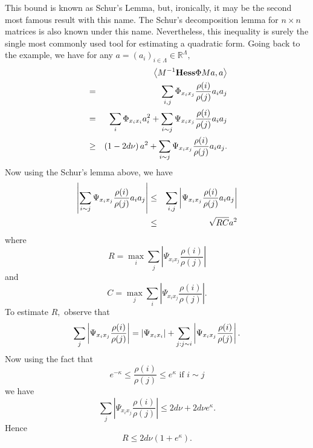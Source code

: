 \documentclass{article}
\begin{document}
This bound is known as Schur's Lemma, but, ironically, it may be the second
most famous result with this name. The Schur's decomposition lemma for $%
n\times n$ matrices is also known under this name. Nevertheless, this
inequality is surely the single most commonly used tool for estimating a
quadratic form. Going back to the example, we have for any $a=\left(
a_{i}\right) _{i\in \Lambda }\in \mathbb{R}^{\Lambda },$ 
\begin{eqnarray*}
&&\left\langle M^{-1}\mathbf{Hess}\Phi Ma,a\right\rangle  \\
&=&\sum_{i,j}\Phi _{x_{i}x_{j}}\frac{\rho (i)}{\rho (j)}a_{i}a_{j} \\
&=&\sum_{i}\Phi _{x_{i}x_{i}}a_{i}^{2}+\sum_{i\sim j}\Psi _{x_{i}x_{j}}\frac{%
\rho (i)}{\rho (j)}a_{i}a_{j} \\
&\geq &\left( 1-2d\nu \right) a^{2}+\sum_{i\sim j}\Psi _{x_{i}x_{j}}\frac{%
\rho (i)}{\rho (j)}a_{i}a_{j}.
\end{eqnarray*}%
Now using the Schur's lemma above, we have 
\begin{eqnarray*}
\left| \sum_{i\sim j}\Psi _{x_{i}x_{j}}\frac{\rho (i)}{\rho (j)}%
a_{i}a_{j}\right|  &\leq &\sum_{i,j}\left| \Psi _{x_{i}x_{j}}\frac{\rho (i)}{%
\rho (j)}a_{i}a_{j}\right|  \\
&\leq &\sqrt{RC}a^{2}
\end{eqnarray*}%
where 
\begin{equation*}
R=\max\limits_{i}\sum_{j}\left| \Psi _{x_{i}x_{j}}\frac{\rho (i)}{\rho (j)}%
\right| 
\end{equation*}%
and 
\begin{equation*}
C=\max\limits_{j}\sum_{i}\left| \Psi _{x_{i}x_{j}}\frac{\rho (i)}{\rho (j)}%
\right| .
\end{equation*}%
To estimate $R,$ observe that%
\begin{equation*}
\sum_{j}\left| \Psi _{x_{i}x_{j}}\frac{\rho (i)}{\rho (j)}\right| =\left|
\Psi _{x_{i}x_{i}}\right| +\sum_{j:j\sim i}\left| \Psi _{x_{i}x_{j}}\frac{%
\rho (i)}{\rho (j)}\right| .
\end{equation*}%
Now using the fact that 
\begin{equation*}
e^{-\kappa }\leq \frac{\rho (i)}{\rho (j)}\leq e^{\kappa }\text{ \ \ \ \ if }%
i\sim j
\end{equation*}%
we have 
\begin{equation*}
\sum_{j}\left| \Psi _{x_{i}x_{j}}\frac{\rho (i)}{\rho (j)}\right| \leq 2d\nu
+2d\nu e^{\kappa }.
\end{equation*}%
Hence 
\begin{equation*}
R\leq 2d\nu \left( 1+e^{\kappa }\right) .
\end{equation*}%
\end{document}
